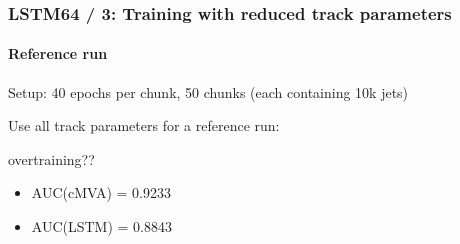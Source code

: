 \documentclass{beamer}
\begin{document}
\begin{frame}
  \frametitle{LSTM64 / 3: Training with reduced track parameters}
  \framesubtitle{Reference run}
  Setup: 40 epochs per chunk, 50 chunks (each containing 10k jets)

  Use all track parameters for a reference run:
  \begin{figure}
    \centering
  \end{figure}

  overtraining??
  
  \begin{itemize}
  \item AUC(cMVA) = 0.9233
  \item AUC(LSTM) = 0.8843
  \end{itemize}
\end{frame}
\end{document}
